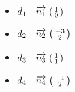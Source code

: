 \documentclass[12pt, a4paper]{article}
\begin{document}
	\begin{Exercise}[number={51}]
		\begin{itemize}
			\item $d_1 \quad \overrightarrow{n_1}\ \begin{psmallmatrix}1 \\ 0\end{psmallmatrix}$
			\item $d_2 \quad \overrightarrow{n_2}\ \begin{psmallmatrix}-3 \\ 2\end{psmallmatrix}$
			\item $d_3 \quad \overrightarrow{n_3}\ \begin{psmallmatrix}1 \\ 1\end{psmallmatrix}$
			\item $d_4 \quad \overrightarrow{n_4}\ \begin{psmallmatrix}-1 \\ 2\end{psmallmatrix}$
		\end{itemize}
	\end{Exercise}
\end{document}
